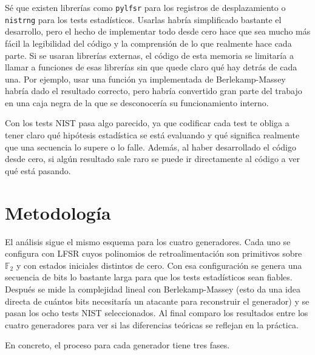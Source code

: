 Sé que existen librerías como \texttt{pylfsr} para los registros de desplazamiento
o \texttt{nistrng} para los tests estadísticos. Usarlas habría simplificado bastante el desarrollo,
pero el hecho de implementar todo desde cero hace que sea mucho más fácil la legibilidad del código
y la comprensión de lo que realmente hace cada parte. Si se usaran librerías externas,
el código de esta memoria se limitaría a llamar a funciones de esas librerías sin que quede claro qué hay detrás de cada una.
Por ejemplo, usar una función ya implementada de Berlekamp-Massey habría dado el resultado correcto,
pero habría convertido gran parte del trabajo en una caja negra de la que se desconocería su funcionamiento interno.

Con los tests NIST pasa algo parecido, ya que codificar cada test te obliga a tener claro qué hipótesis estadística se está evaluando
y qué significa realmente que una secuencia lo supere o lo falle.
Además, al haber desarrollado el código desde cero, si algún resultado sale raro se puede ir directamente al código a ver qué está pasando.

\section{Metodología}

El análisis sigue el mismo esquema para los cuatro generadores.
Cada uno se configura con LFSR cuyos polinomios de retroalimentación son primitivos sobre $\mathbb{F}_2$
y con estados iniciales distintos de cero. Con esa configuración se genera una secuencia de bits lo bastante larga
para que los tests estadísticos sean fiables. Después se mide la complejidad lineal con Berlekamp-Massey
(esto da una idea directa de cuántos bits necesitaría un atacante para reconstruir el generador)
y se pasan los ocho tests NIST seleccionados. Al final comparo los resultados entre los cuatro generadores
para ver si las diferencias teóricas se reflejan en la práctica.

En concreto, el proceso para cada generador tiene tres fases.

